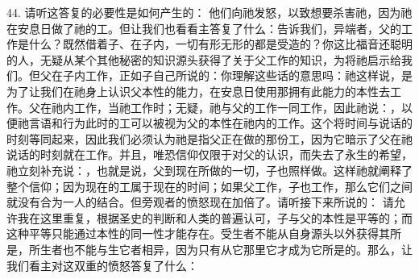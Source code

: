 44. 请听这答复的必要性是如何产生的： 他们向祂发怒，以致想要杀害祂，因为祂在安息日做了祂的工。但让我们也看看主答复了什么：告诉我们，异端者，父的工作是什么？既然借着子、在子内，一切有形无形的都是受造的？你这比福音还聪明的人，无疑从某个其他秘密的知识源头获得了关于父工作的知识，为将祂启示给我们。但父在子内工作，正如子自己所说的：你理解这些话的意思吗：祂这样说，是为了让我们在祂身上认识父本性的能力，在安息日使用那拥有此能力的本性去工作。父在祂内工作，当祂工作时；无疑，祂与父的工作一同工作，因此祂说：，以便祂言语和行为此时的工可以被视为父的本性在祂内的工作。这个将时间与说话的时刻等同起来，因此我们必须认为祂是指父正在做的那份工，因为它暗示了父在祂说话的时刻就在工作。并且，唯恐信仰仅限于对父的认识，而失去了永生的希望，祂立刻补充说：，也就是说，父到现在所做的一切，子也照样做。这样祂就阐释了整个信仰；因为现在的工属于现在的时间；如果父工作，子也工作，那么它们之间就没有合为一人的结合。但旁观者的愤怒现在加倍了。请听接下来所说的： 请允许我在这里重复，根据圣史的判断和人类的普遍认可，子与父的本性是平等的；而这种平等只能通过本性的同一性才能存在。受生者不能从自身源头以外获得其所是，所生者也不能与生它者相异，因为只有从它那里它才成为它所是的。那么，让我们看主对这双重的愤怒答复了什么：\par


